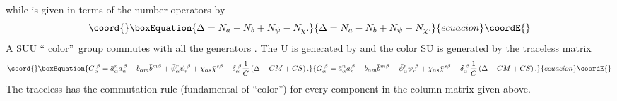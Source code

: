 \documentclass[a4paper,aps,preprint,nofootinbib]{revtex4}
\begin{document}
while \myHighlight{$\Delta$}\coordHE{} is given in terms of the number operators by
\begin{equation}\coord{}\boxEquation{
\Delta=N_{a}-N_{b}+N_{\psi}-N_{\chi}.
}{
\Delta=N_{a}-N_{b}+N_{\psi}-N_{\chi}.
}{ecuacion}\coordE{}\end{equation}
A SU\coordHE{}U\myHighlight{$\left( 1\right) $}\coordHE{} \textquotedblleft
color\textquotedblright\ group commutes with all the generators
\coordHE{}. The U\myHighlight{$\left( 1\right) $}\coordHE{} is generated by \myHighlight{$\Delta$}\coordHE{} and the
color SU\coordHE{} is generated by the traceless matrix
\coordHE{}
\begin{equation}\coord{}\boxEquation{
G_{\alpha}^{\,\,\beta}=\bar{a}_{\alpha}^{n}a_{n}^{\,\beta}-b_{\alpha m}\bar {
b}^{m\beta}+\bar{\psi}_{\alpha}^{r}\psi_{r}^{\,\,\beta}+\chi_{\alpha s}\bar{
\chi}^{s\beta}-\delta_{\alpha}^{\,\,\beta}\frac{1}{C}\left(
\Delta-CM+CS\right) .
}{
G_{\alpha}^{\,\,\beta}=\bar{a}_{\alpha}^{n}a_{n}^{\,\beta}-b_{\alpha m}\bar {
b}^{m\beta}+\bar{\psi}_{\alpha}^{r}\psi_{r}^{\,\,\beta}+\chi_{\alpha s}\bar{
\chi}^{s\beta}-\delta_{\alpha}^{\,\,\beta}\frac{1}{C}\left(
\Delta-CM+CS\right) .
}{ecuacion}\coordE{}\end{equation}
The traceless \coordHE{} has the commutation rule \coordHE{} (fundamental of \textquotedblleft color\textquotedblright) for
every component \myHighlight{$\Xi^{\alpha}$}\coordHE{} in the column matrix given above.
\end{document}
